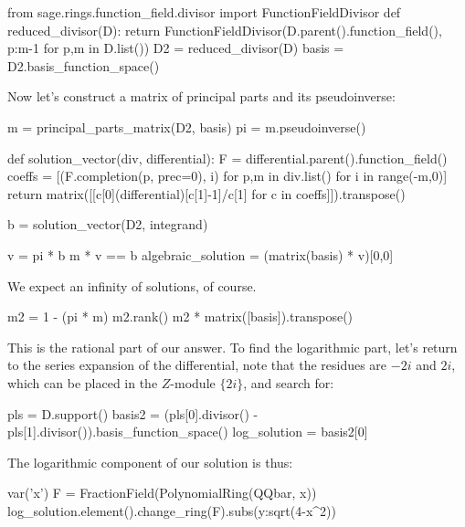 \begin{sageblock}[ex8.7]
from sage.rings.function_field.divisor import FunctionFieldDivisor
def reduced_divisor(D):
    return FunctionFieldDivisor(D.parent().function_field(),
                                {p:m-1 for p,m in D.list()})
D2 = reduced_divisor(D)
basis = D2.basis_function_space()
\end{sageblock}

Now let's construct a matrix of principal parts
and its pseudoinverse:

\begin{sageblock}[ex8.7]
m = principal_parts_matrix(D2, basis)
pi = m.pseudoinverse()
\end{sageblock}

\begin{sageblock}[ex8.7]
def solution_vector(div, differential):
    F = differential.parent().function_field()
    coeffs = [(F.completion(p, prec=0), i) for p,m in div.list() for i in range(-m,0)]
    return matrix([[c[0](differential)[c[1]-1]/c[1] for c in coeffs]]).transpose()
\end{sageblock}

\begin{sageblock}[ex8.7]
b = solution_vector(D2, integrand)
\end{sageblock}

\begin{sageblock}[ex8.7]
v = pi * b
m * v == b
algebraic_solution = (matrix(basis) * v)[0,0]
\end{sageblock}

We expect an infinity of solutions, of course.

\begin{sageblock}[ex8.7]
m2 = 1 - (pi * m)
m2.rank()
m2 * matrix([basis]).transpose()
\end{sageblock}

This is the rational part of our answer.  To find the logarithmic
part, let's return to the series expansion of the differential,
note that the residues are $-2i$ and $2i$, which can be placed
in the $Z$-module $\{2i\}$, and search for:

\begin{sageblock}[ex8.7]
pls = D.support()
basis2 = (pls[0].divisor() - pls[1].divisor()).basis_function_space()
log_solution = basis2[0]
\end{sageblock}

The logarithmic component of our solution is thus:

\begin{sageblock}[ex8.7]
var('x')
F = FractionField(PolynomialRing(QQbar, x))
log_solution.element().change_ring(F).subs({y:sqrt(4-x^2)})
\end{sageblock}

